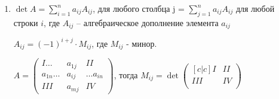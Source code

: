 \begin{enumerate}
\begin{itemize}
                    где
                    \(A =\begin{pmatrix}
                        A^1    & 0      & \ldots & 0       \\
                        *      & A^2    & \ldots & 0       \\
                        \vdots & \vdots & \ddots & \vdots  \\
                        *      & *      & \ldots & A^{m-1}
                    \end{pmatrix} \)
          \end{itemize}

          Следствия:
          \begin{enumerate}
              \item \(\det\begin{pmatrix}
                        a_{11} & 0      \\
                        *      & a_{nn} \\
                    \end{pmatrix} = a_{11} \cdot \ldots \cdot a_{nn}\)\\
              \item  \(\rg{A} = n \Rightarrow \det A \neq 0\)

                    Просто преобразуем \(A\) методом Гаусса и получим трапециевидную. \(\rg{A} = n \Rightarrow\) после преобразований она будет треугольной, значит на диагонали нет нулей, значит их произведение не 0.
          \end{enumerate}

          Замечание: в силу свойства 1, всё сказанное верно и для верхнетреугольных матриц.

    \item \(\det A = \sum\limits_{i=1}^n a_{ij} A_{ij}\), для любого столбца j = \(\sum\limits_{j=1}^na_{ij}A_{ij}\) для любой строки $i$, где $A_{ij}$ -- алгебраическое дополнение элемента $a_{ij}$

          \( A_{ij} = ({-1})^{i+j} \cdot M_{ij}\), где \(M_{ij}\) - минор.

          \(A=\begin{pmatrix}
              I \ldots      & a_{1j} & II             \\
              a_{1n} \ldots & a_{ij} & \ldots  a_{in} \\
              III           & a_{mj} & IV
          \end{pmatrix}\), тогда \(M_{ij} = \det
          \begin{pmatrix}[c|c]
              I   & II \\
              \hline
              III & IV \\
          \end{pmatrix}\)


\end{enumerate}
